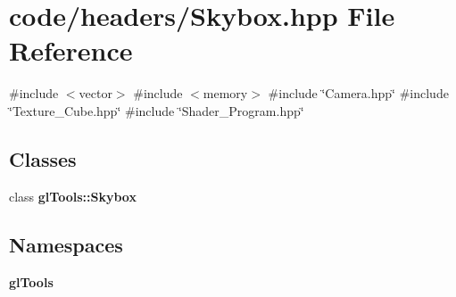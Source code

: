 \section{code/headers/\+Skybox.hpp File Reference}
\label{_skybox_8hpp}
{\ttfamily \#include $<$vector$>$}\newline
{\ttfamily \#include $<$memory$>$}\newline
{\ttfamily \#include \char`\"{}Camera.\+hpp\char`\"{}}\newline
{\ttfamily \#include \char`\"{}Texture\+\_\+\+Cube.\+hpp\char`\"{}}\newline
{\ttfamily \#include \char`\"{}Shader\+\_\+\+Program.\+hpp\char`\"{}}\newline
\subsection*{Classes}
\begin{DoxyCompactItemize}
\item 
class \textbf{ gl\+Tools\+::\+Skybox}
\end{DoxyCompactItemize}
\subsection*{Namespaces}
\begin{DoxyCompactItemize}
\item 
 \textbf{ gl\+Tools}
\end{DoxyCompactItemize}
